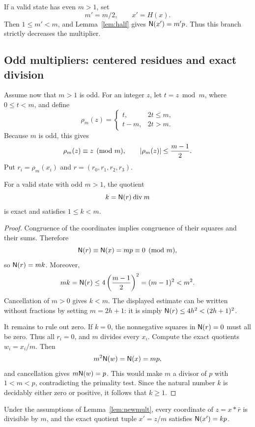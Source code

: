 If a valid state has even $m>1$, set
\[
 m'=m/2,\qquad x'=H(x).
\]
Then $1\le m'<m$, and Lemma~\ref{lem:half} gives $\mathsf N(x')=m'p$.
Thus this branch strictly decreases the multiplier.

\subsection{Odd multipliers: centered residues and exact division}

Assume now that $m>1$ is odd. For an integer $z$, let $t=z\bmod m$,
where $0\le t<m$, and define
\begin{equation}
\label{eq:center}
 \rho_m(z)=
 \begin{cases}
 t,&2t\le m,\\
 t-m,&2t>m.
 \end{cases}
\end{equation}
Because $m$ is odd, this gives
\begin{equation}
\label{eq:centerbound}
 \rho_m(z)\equiv z\pmod m,\qquad
 \lvert\rho_m(z)\rvert\le\frac{m-1}{2}.
\end{equation}
Put $r_i=\rho_m(x_i)$ and $r=(r_0,r_1,r_2,r_3)$.

\begin{lemma}
\label{lem:newmult}
For a valid state with odd $m>1$, the quotient
\[
 k=\mathsf N(r)\mathbin{\mathrm{div}}m
\]
is exact and satisfies $1\le k<m$.
\end{lemma}

\begin{proof}
Congruence of the coordinates implies congruence of their squares and
their sums. Therefore
\[
 \mathsf N(r)\equiv\mathsf N(x)=mp\equiv0\pmod m,
\]
so $\mathsf N(r)=mk$. Moreover,
\[
 mk=\mathsf N(r)
 \le4\left(\frac{m-1}{2}\right)^2
 =(m-1)^2<m^2.
\]
Cancellation of $m>0$ gives $k<m$. The displayed estimate can be written
without fractions by setting $m=2h+1$: it is simply
$\mathsf N(r)\le4h^2<(2h+1)^2$.

It remains to rule out zero. If $k=0$, the nonnegative squares in
$\mathsf N(r)=0$ must all be zero. Thus all $r_i=0$, and $m$ divides every
$x_i$. Compute the exact quotients $w_i=x_i/m$. Then
\[
 m^2\mathsf N(w)=\mathsf N(x)=mp,
\]
and cancellation gives $m\mathsf N(w)=p$. This would make $m$ a divisor of
$p$ with $1<m<p$, contradicting the primality test. Since the natural
number $k$ is decidably either zero or positive, it follows that $k\ge1$.
\end{proof}

\begin{lemma}
\label{lem:quotient}
Under the assumptions of Lemma~\ref{lem:newmult}, every coordinate of
$z=x*\bar r$ is divisible by $m$, and the exact quotient tuple
$x'=z/m$ satisfies $\mathsf N(x')=kp$.
\end{lemma}

